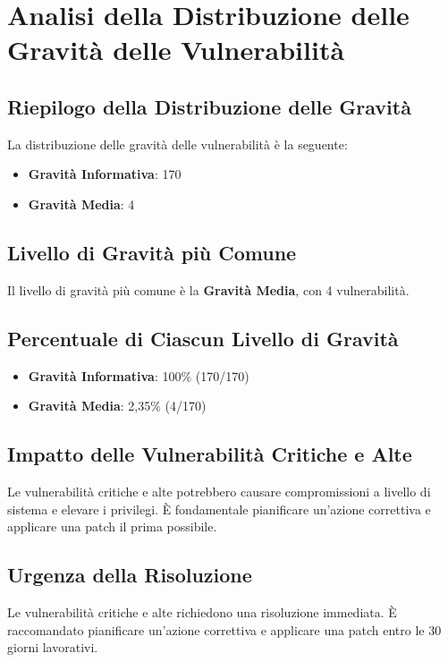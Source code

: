 \chapter{Analisi della Distribuzione delle Gravità delle Vulnerabilità}

\section{Riepilogo della Distribuzione delle Gravità}

La distribuzione delle gravità delle vulnerabilità è la seguente:
\begin{itemize}
\item \textbf{Gravità Informativa}: 170
\item \textbf{Gravità Media}: 4
\end{itemize}
\section{Livello di Gravità più Comune}

Il livello di gravità più comune è la \textbf{Gravità Media}, con 4 vulnerabilità.

\section{Percentuale di Ciascun Livello di Gravità}
\begin{itemize}
\item \textbf{Gravità Informativa}: 100\% (170/170)
\item \textbf{Gravità Media}: 2,35\% (4/170)
\end{itemize}
\section{Impatto delle Vulnerabilità Critiche e Alte}

Le vulnerabilità critiche e alte potrebbero causare compromissioni a livello di sistema e elevare i privilegi. È fondamentale pianificare un'azione correttiva e applicare una patch il prima possibile.

\section{Urgenza della Risoluzione}

Le vulnerabilità critiche e alte richiedono una risoluzione immediata. È raccomandato pianificare un'azione correttiva e applicare una patch entro le 30 giorni lavorativi.

